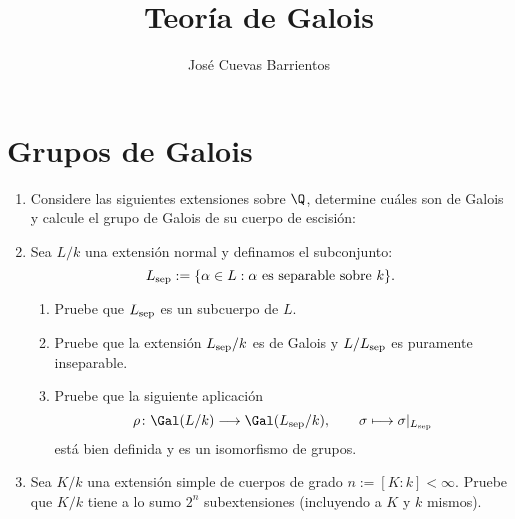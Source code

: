 \documentclass[11pt, reqno]{amsart}
\title{Teoría de Galois}
\date{\DTMdate{2025-08-20}}
\author{José Cuevas Barrientos}
\begin{document}
\maketitle

\section{Grupos de Galois}
\begin{enumerate}
	\item Considere las siguientes extensiones sobre $\Q$, determine cuáles son de Galois y calcule el grupo de Galois de su cuerpo de escisión:
		\begin{enumerate}
		\end{enumerate}

	\item Sea $L/k$ una extensión normal y definamos el subconjunto:
		\[
			L_{\rm sep} := \{ \alpha \in L : \alpha \text{ es separable sobre } k \}.
		\]
		\begin{enumerate}
			\item Pruebe que $L_{\rm sep}$ es un subcuerpo de $L$.
			\item Pruebe que la extensión $L_{\rm sep}/k$ es de Galois y $L/L_{\rm sep}$ es puramente inseparable.
			\item Pruebe que la siguiente aplicación
				\[
					\rho \colon \Gal(L/k) \longrightarrow \Gal(L_{\rm sep}/k), \qquad \sigma \longmapsto \sigma|_{L_{\rm sep}}
				\]
				está bien definida y es un isomorfismo de grupos.
		\end{enumerate}

	\item\label{exr:simple_subextension_count}\lookright
		Sea $K/k$ una extensión simple de cuerpos de grado $n := [K:k] < \infty$.
		Pruebe que $K/k$ tiene a lo sumo $2^n$ subextensiones (incluyendo a $K$ y $k$ mismos).


\end{enumerate}
\end{document}
